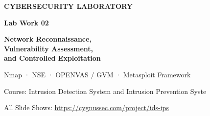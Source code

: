 \begin{frame}[plain]
  \vfill
  {\color{ResearchColor}\fontsize{15}{18}\selectfont\bfseries CYBERSECURITY LABORATORY\par}
  \vspace{0.15cm}
  {\color{SecondaryColor}\fontsize{17}{20}\selectfont\bfseries Lab Work 02\par}
  \vspace{0.22cm}
  {\color{TitleColor}\fontsize{23}{27}\selectfont\bfseries
    Network Reconnaissance,\\
    Vulnerability Assessment,\\
    and Controlled Exploitation\par}
  \vspace{0.22cm}
  {\color{ResearchColor}\fontsize{16}{19}\selectfont
    Nmap · NSE · OPENVAS / GVM · Metasploit Framework\par}
  \vspace{0.18cm}
  {\color{SecondaryColor}\fontsize{13}{16}\selectfont
    Course: Intrusion Detection System and Intrusion Prevention Syste\par}
  \vfill
  {\color{SecondaryColor}\fontsize{12}{15}\selectfont All Slide Shows: \url{https://cygnussec.com/project/ids-ips}\par}
\end{frame}
